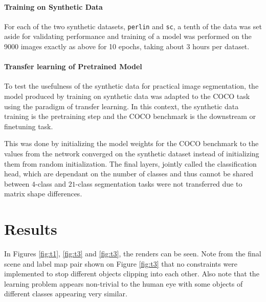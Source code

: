 \documentclass[12pt,fleqn]{article}
\begin{document}
\paragraph{Training on Synthetic Data}
For each of the two synthetic datasets, \texttt{perlin} and \texttt{sc}, a tenth of the data was set aside for validating performance and training of a model was performed on the 9000 images exactly as above for 10 epochs, taking about $3$ hours per dataset.


\paragraph{Transfer learning of Pretrained Model}
To test the usefulness of the synthetic data for practical image segmentation, the model produced by training on synthetic data was adapted to the COCO task using the paradigm of transfer learning.
In this context, the synthetic data training is the pretraining step and the COCO benchmark is the downstream or finetuning task.

This was done by initializing the model weights for the COCO benchmark to the values from the network converged on the synthetic dataset instead of initializing them from random initialization.
The final layers, jointly called the classification head, which are dependant on the number of classes and thus cannot be shared between $4$-class and $21$-class segmentation tasks were not transferred due to matrix shape differences.

\section{Results}%
In Figures \ref{fig:t1}, \ref{fig:t3} and \ref{fig:t3}, the renders can be seen.
Note from the final scene and label map pair shown on Figure \ref{fig:t3} that no constraints were implemented to stop different objects clipping into each other.
Also note that the learning problem appears non-trivial to the human eye with some objects of different classes appearing very similar.
\end{document}
